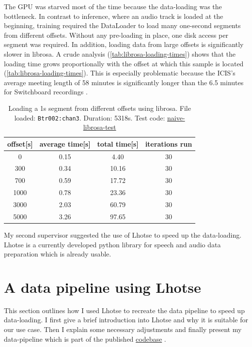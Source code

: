 \documentclass[bsc,frontabs,parskip,deptreport]{infthesis}
\newcommand{\coderepo}{\href{https://github.com/LasseWolter/laughter-detection-icsi}{codebase} }
\begin{document}
The GPU was starved most of the time because the data-loading was the bottleneck. In contrast to inference, where an audio track is loaded at the beginning, training required the DataLoader to load many one-second segments from different offsets.
Without any pre-loading in place, one disk access per segment was required. 
In addition, loading data from large offsets is significantly slower in librosa. A crude analysis (\autoref{tab:librosa-loading-times}) shows that the loading time grows proportionally with the offset at which this sample is located (\autoref{tab:librosa-loading-times}). 
This is especially problematic because the ICIS's average meeting length of 58 minutes \citep{icsi-ldc} is significantly longer than the 6.5 minutes for Switchboard recordings \citep{switchboard-ldc}.

\begin{table}[h!]
    \centering
    \begin{tabular}{|c|c|c|c|}
    \hline
    offset[s] & average time[s] & total time[s] & iterations run \\
    \hline
    0  & 0.15 & 4.40 & 30    \\
    300 & 0.34 & 10.16 & 30  \\ 
    700 & 0.59 & 17.72 & 30  \\
    1000 & 0.78 & 23.36 & 30 \\  
    3000 & 2.03 & 60.79 & 30 \\
    5000 & 3.26 & 97.65 & 30 \\
    \hline
    \end{tabular}
    \caption{Loading a 1s segment from different offsets using librosa. File loaded: \texttt{Btr002:chan3}. Duration: 5318s. Test code: \href{https://github.com/LasseWolter/laughter-detection-icsi/tree/main/misc_scripts}{naive-librosa-test}}
    \label{tab:librosa-loading-times}
\end{table}


My second supervisor suggested the use of Lhotse \citep{zelasko2021lhotse} to speed up the data-loading. Lhotse is a currently developed python library for speech and audio data preparation which is already usable.

\section{A data pipeline using Lhotse}
This section outlines how I used Lhotse to recreate the data pipeline to speed up data-loading. I first give a brief introduction into Lhotse and why it is suitable for our use case. Then I explain some necessary adjustments and finally present my data-pipeline which is part of the published \coderepo.
\end{document}
